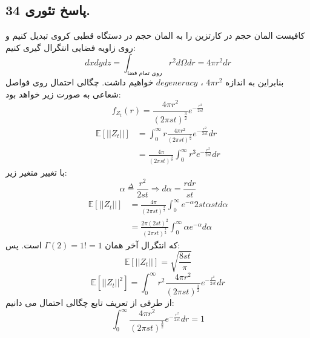 \documentclass[]{article}
\begin{document}
\subsection{پاسخ تئوری 34.}
کافیست المان حجم در کارتزین را به المان حجم در دستگاه قطبی کروی تبدیل کنیم و روی زاویه فضایی انتگرال گیری کنیم:
\begin{equation}
	\nonumber
	dx dy dz = \int_{\text{روی تمام فضا}}r^2 d\Omega dr = 4\pi r^2 dr
\end{equation}
بنابراین به اندازه
$4\pi r^2$
،
$degeneracy$
  خواهیم داشت. چگالی احتمال روی فواصل شعاعی به صورت زیر خواهد بود:
\begin{equation}
	\nonumber
	f_{Z_t}(r)= \frac{4\pi r^2}{(2\pi st)^{\frac{3}{2}}} e^{-\frac{r^2}{2st}}	
\end{equation}
\begin{equation}
	\nonumber
	\begin{split}
		\mathbb{E}[||Z_t||] &= \int_{0}^{\infty} r \frac{4\pi r^2}{(2\pi st)^{\frac{3}{2}}} e^{-\frac{r^2}{2st}} dr\\
		&= \frac{4\pi}{(2\pi st)^{\frac{3}{2}}} \int_{0}^{\infty} r^3 e^{-\frac{r^2}{2st}} dr
	\end{split}
\end{equation}
با تغییر متغیر زیر:
\begin{equation}
	\nonumber
	\alpha \overset{\Delta}{=} \frac{r^2}{2st}
	\Rightarrow d\alpha = \frac{rdr}{st}
\end{equation}
\begin{equation}
	\nonumber
	\begin{split}
		\mathbb{E}[||Z_t||] &= \frac{4\pi}{(2\pi st)^\frac{3}{2}} \int_{0}^{\infty} e^{-\alpha} 2st \alpha st d\alpha\\
		&= \frac{2\pi (2st)^2}{(2\pi st)^\frac{3}{2}} \int_{0}^{\infty} \alpha e^{-\alpha} d\alpha 
	\end{split}
\end{equation}
که انتگرال آخر همان 
$\Gamma(2) = 1! = 1$
است. پس:
\begin{equation}
	\nonumber
	\mathbb{E}[||Z_t||] = \sqrt{\frac{8st}{\pi}}
\end{equation}
\begin{equation}
	\nonumber
	\mathbb{E}[||Z_t||^2] = \int_{0}^{\infty} r^2 \frac{4\pi r^2}{(2\pi st)^{\frac{3}{2}}} e^{-\frac{r^2}{2st}} dr
\end{equation}
از طرفی از تعریف تابع چگالی احتمال می دانیم:
\begin{equation}
	\nonumber
	\int_{0}^{\infty} \frac{4\pi r^2}{(2\pi st)^{\frac{3}{2}}} e^{-\frac{r^2}{2st}} dr = 1
\end{equation}
\end{document}
